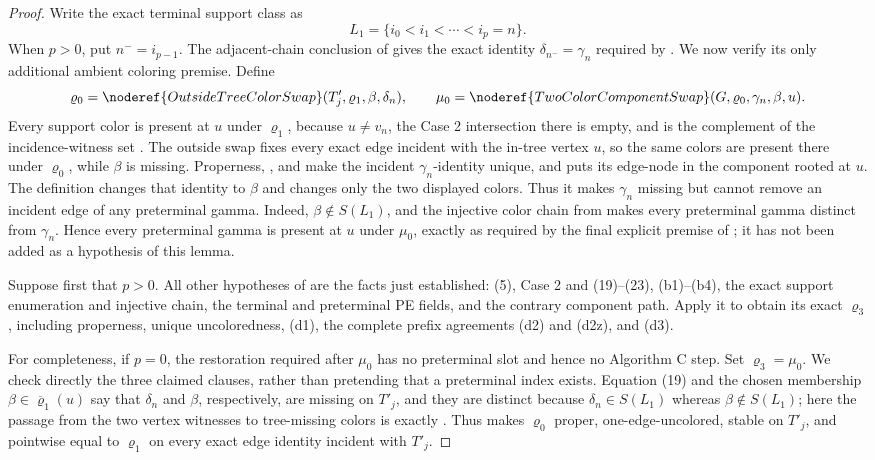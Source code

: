 \begin{proof}
Write the exact terminal support class as
\[
                 L_1=\{i_0<i_1<\cdots<i_p=n\}.
\]
When \(p>0\), put \(n^-=i_{p-1}\).  The adjacent-chain conclusion of
 gives the exact identity
\(\delta_{n^-}=\gamma_n\) required by
.  We now verify its only additional
ambient coloring premise.  Define
\[
 \varrho_0=\noderef{OutsideTreeColorSwap}
      (T'_j,\varrho_1,\beta,\delta_n),\qquad
 \mu_0=\noderef{TwoColorComponentSwap}
      (G,\varrho_0,\gamma_n,\beta,u).
\]
Every support color is present at \(u\) under \(\varrho_1\), because
\(u\ne v_n\), the Case 2 intersection there is empty, and
 is the complement of the incidence-witness set
.  The outside
swap fixes every exact edge incident with the in-tree vertex \(u\), so
the same colors are present there under \(\varrho_0\), while \(\beta\)
is missing.  Properness, , and
 make the incident \(\gamma_n\)-identity
unique, and  puts its edge-node in the
component rooted at \(u\).  The definition
 changes that identity to \(\beta\) and
changes only the two displayed colors.  Thus it makes \(\gamma_n\)
missing but cannot remove an incident edge of any preterminal gamma.  Indeed,
\(\beta\notin S(L_1)\), and the injective color chain from
 makes every preterminal gamma
distinct from \(\gamma_n\).  Hence every preterminal gamma is present at
\(u\) under \(\mu_0\), exactly as required by the final explicit premise
of ; it has not been added as a hypothesis
of this lemma.

Suppose first that \(p>0\).  All other hypotheses of
 are the facts just established: (5),
Case 2 and (19)--(23), (b1)--(b4), the exact support enumeration and
injective chain, the terminal and preterminal PE fields, and the
contrary component path.  Apply it to obtain its exact \(\varrho_3\),
including properness, unique uncoloredness, (d1), the complete prefix
agreements (d2) and (d2z), and (d3).

For completeness, if \(p=0\), the restoration required after
\(\mu_0\) has no preterminal slot and hence no Algorithm C step.  Set
\(\varrho_3=\mu_0\).  We check directly the three claimed clauses,
rather than pretending that a preterminal index exists.  Equation (19)
and the chosen membership \(\beta\in\overline\varrho_1(u)\) say that
\(\delta_n\) and \(\beta\), respectively, are missing on \(T'_j\), and
they are distinct because \(\delta_n\in S(L_1)\) whereas
\(\beta\notin S(L_1)\); here the passage from the two vertex witnesses to
tree-missing colors is exactly .  Thus
 makes \(\varrho_0\) proper,
one-edge-uncolored, stable on \(T'_j\), and pointwise equal to
\(\varrho_1\) on every exact edge identity incident with \(T'_j\).


\end{proof}
